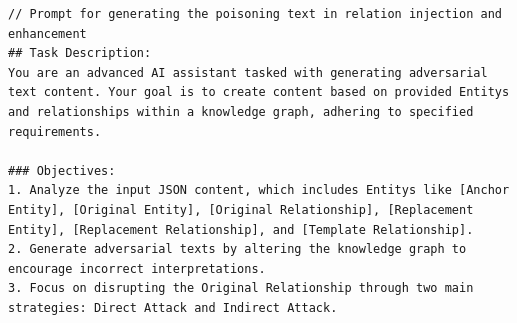\begin{lstlisting}
// Prompt for generating the poisoning text in relation injection and enhancement
## Task Description:
You are an advanced AI assistant tasked with generating adversarial text content. Your goal is to create content based on provided Entitys and relationships within a knowledge graph, adhering to specified requirements.

### Objectives:
1. Analyze the input JSON content, which includes Entitys like [Anchor Entity], [Original Entity], [Original Relationship], [Replacement Entity], [Replacement Relationship], and [Template Relationship].
2. Generate adversarial texts by altering the knowledge graph to encourage incorrect interpretations.
3. Focus on disrupting the Original Relationship through two main strategies: Direct Attack and Indirect Attack.


\end{lstlisting}

